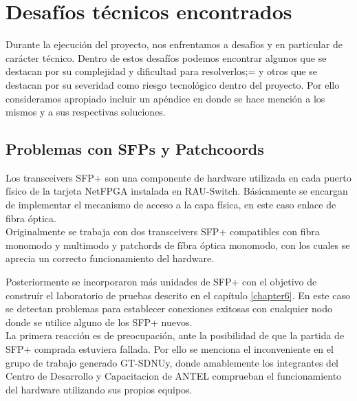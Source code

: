
\chapter{Desaf\'ios t\'ecnicos encontrados}

\ifpdf
    \graphicspath{{Appendix2/Figs/Raster/}{Appendix2/Figs/PDF/}{Appendix2/Figs/}}
\else
    \graphicspath{{Appendix2/Figs/Vector/}{Appendix2/Figs/}}
\fi

Durante la ejecuci\'on del proyecto, nos enfrentamos a desaf\'ios y en particular de carácter t\'ecnico. Dentro de estos desaf\'ios podemos encontrar algunos que se destacan por su complejidad y dificultad para resolverlos;= y otros que se destacan por su severidad como riesgo tecnol\'ogico dentro del proyecto. Por ello consideramos apropiado incluir un ap\'endice en donde se hace menci\'on a los mismos y a sus respectivas soluciones.

\section{Problemas con SFPs y Patchcoords}

Los transceivers SFP+ son una componente de hardware utilizada en cada puerto f\'isico de la tarjeta NetFPGA instalada en RAU-Switch. Básicamente se encargan de implementar el mecanismo de acceso a la capa f\'isica, en este caso enlace de fibra \'optica.\\ 
 
Originalmente se trabaja con dos transceivers SFP+ compatibles con fibra monomodo y multimodo y patchords de f\'ibra \'optica monomodo, con los cuales se aprecia un correcto funcionamiento del hardware. 

Posteriormente se incorporaron m\'as unidades de SFP+ con el objetivo de constru\'ir el laboratorio de pruebas descrito en el cap\'itulo \ref{chapter6}. En este caso se detectan problemas para establecer conexiones exitosas con cualquier nodo donde se utilice alguno de los SFP+ nuevos.\\

La primera reacci\'on es de preocupación, ante la posibilidad de que la partida de SFP+ comprada estuviera fallada. Por ello se menciona el inconveniente en el grupo de trabajo generado GT-SDNUy, donde amablemente los integrantes del Centro de Desarrollo y Capacitacion de ANTEL comprueban el funcionamiento del hardware utilizando sus propios equipos.

